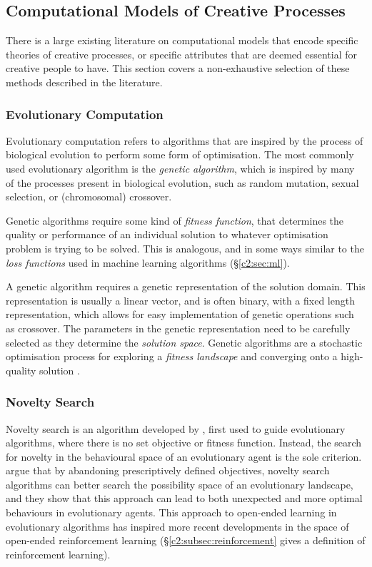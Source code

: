 \subsection{Computational Models of Creative Processes}

There is a large existing literature on computational models that encode specific theories of creative processes, or specific attributes that are deemed essential for creative people to have.
This section covers a non-exhaustive selection of these methods described in the literature.

\subsubsection{Evolutionary Computation}

Evolutionary computation refers to algorithms that are inspired by the process of biological evolution to perform some form of optimisation. 
The most commonly used evolutionary algorithm is the \textit{genetic algorithm}, which is inspired by many of the processes present in biological evolution, such as random mutation, sexual selection, or (chromosomal) crossover.

Genetic algorithms require some kind of \textit{fitness function}, that determines the quality or performance of an individual solution to whatever optimisation problem is trying to be solved. 
This is analogous, and in some ways similar to the \textit{loss functions} used in machine learning algorithms (\S \ref{c2:sec:ml}). 

A genetic algorithm requires a genetic representation of the solution domain. 
This representation is usually a linear vector, and is often binary, with a fixed length representation, which allows for easy implementation of genetic operations such as crossover. 
The parameters in the genetic representation need to be carefully selected as they determine the \textit{solution space}.
Genetic algorithms are a stochastic optimisation process for exploring a \textit{fitness landscape} and converging onto a high-quality solution \citep{back1996evolutionary}.

\subsubsection{Novelty Search}

Novelty search is an algorithm developed by \cite{lehman2008exploiting}, first used to guide evolutionary algorithms, where there is no set objective or fitness function.
Instead, the search for novelty in the behavioural space of an evolutionary agent is the sole criterion. \cite{lehman2010efficiently, lehman2011abandoning,lehman2011novelty} argue that by abandoning prescriptively defined objectives, novelty search algorithms can better search the possibility space of an evolutionary landscape, and they show that this approach can lead to both unexpected and more optimal behaviours in evolutionary agents.
This approach to open-ended learning in evolutionary algorithms has inspired more recent developments in the space of open-ended reinforcement learning \citep{wang2020enhanced} (\S \ref{c2:subsec:reinforcement} gives a definition of reinforcement learning).

